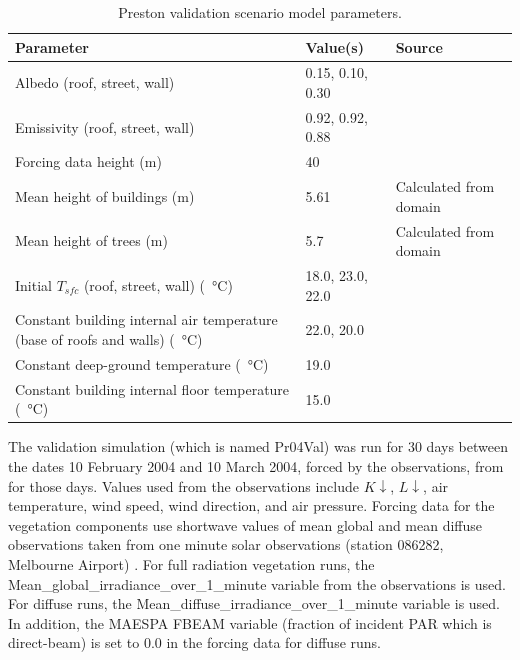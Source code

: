 \documentclass[preprint,12pt,authoryear]{elsarticle}
\begin{document}
\begin{table}[!htbp]
\caption{Preston validation scenario model parameters. \label{tab:modprvalpara}}     
\begin{tabular}{| p{8.0cm} | l | l|}
\hline
\textbf{Parameter} & \textbf{Value(s)} & \textbf{Source}\\ \hline
Albedo (roof, street, wall)   & 0.15, 0.10, 0.30   & \cite{Krayenhoff2007}\\ \hline
Emissivity (roof, street, wall)   & 0.92, 0.92, 0.88   & \cite{Krayenhoff2007}\\ \hline
Forcing data height (m)  & 40   & \cite{Coutts2007} \\ \hline
Mean height of buildings (m)  & 5.61   & Calculated from domain \\ \hline
Mean height of trees (m)  & 5.7   & Calculated from domain \\ \hline
Initial $T_{sfc}$ (roof, street, wall) (\SI{}{\degreeCelsius})  & 18.0, 23.0, 22.0  & \cite{Krayenhoff2007}  \\ \hline
Constant building internal air temperature (base of roofs and walls) (\SI{}{\degreeCelsius})  & 22.0, 20.0 & \cite{Krayenhoff2007}   \\ \hline
Constant deep-ground temperature (\SI{}{\degreeCelsius})  & 19.0  & \cite{Krayenhoff2007} \\ \hline
Constant building internal floor temperature (\SI{}{\degreeCelsius})  & 15.0  & \cite{Krayenhoff2007} \\ \hline
\end{tabular}
\end{table}

The validation simulation (which is named Pr04Val) was run for 30 days between the dates 10 February 2004 and 10 March 2004, forced by the observations, from \cite{Coutts2007} for those days. Values used from the observations include $K\downarrow$, $L\downarrow$, air temperature, wind speed, wind direction, and air pressure. Forcing data for the vegetation components use shortwave values of mean global and mean diffuse observations taken from one minute solar observations (station 086282, Melbourne Airport) \citep{BOM2016}. For full radiation vegetation runs, the Mean\_global\_irradiance\_over\_1\_minute variable from the observations is used. For diffuse runs, the Mean\_diffuse\_irradiance\_over\_1\_minute variable is used. In addition, the MAESPA FBEAM variable (fraction of incident PAR which is direct-beam) is set to 0.0 in the forcing data for diffuse runs.
\end{document}
